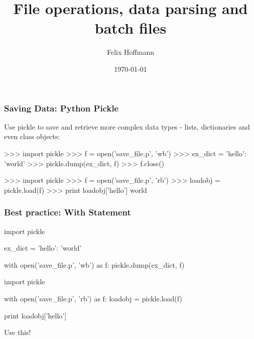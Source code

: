 \documentclass[xcolor=table,10pt]{beamer}
\title {File operations, data parsing and batch files}
\author[Felix Hoffmann]{Felix Hoffmann}
\institute[BCF]{Bernstein Center Freiburg}
\date{\today}
\begin{document}





\begin{frame}[fragile]
  \frametitle{Saving Data: Python Pickle}

  Use pickle to save and retrieve more complex data types - lists,
  dictionaries and even class objects:

  \bigskip\pause

  \begin{mlinepython}
    >>> import pickle 
    >>> f = open('save_file.p', 'wb')
    >>> ex_dict = {'hello': 'world'}
    >>> pickle.dump(ex_dict, f)
    >>> f.close()
  \end{mlinepython}

  \bigskip\pause

  \begin{mlinepython}
    >>> import pickle 
    >>> f = open('save_file.p', 'rb')
    >>> loadobj = pickle.load(f)
    >>> print loadobj['hello']
    world
  \end{mlinepython}

\end{frame}


\begin{frame}[fragile]
  \frametitle{Best practice: With Statement}


  \begin{mlinepython}
    import pickle 

    ex_dict = {'hello': 'world'}

    with open('save_file.p', 'wb') as f:
        pickle.dump(ex_dict, f)
  \end{mlinepython}

  \bigskip \pause
  \vspace{0.2cm}

  \begin{mlinepython}
    import pickle 

    with open('save_file.p', 'rb') as f:
        loadobj = pickle.load(f)

    print loadobj['hello']
  \end{mlinepython}
  \vspace{0.15cm}
  \begin{arrowlist}
  \item Use this!
  \end{arrowlist}

\end{frame}
\end{document}
